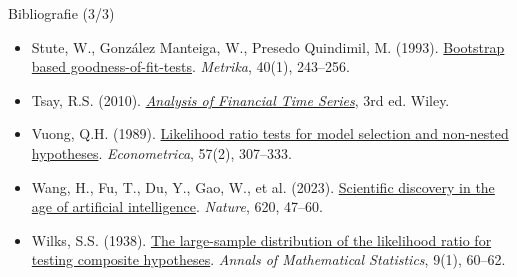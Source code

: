 \begin{frame}{Bibliografie (3/3)}
\begin{itemize}
    \item Stute, W., González Manteiga, W., Presedo Quindimil, M. (1993). \href{https://doi.org/10.1007/BF02613687}{Bootstrap based goodness-of-fit-tests}. \textit{Metrika}, 40(1), 243--256.
    \item Tsay, R.S. (2010). \href{https://doi.org/10.1002/9780470644560}{\textit{Analysis of Financial Time Series}}, 3rd ed. Wiley.
    \item Vuong, Q.H. (1989). \href{https://doi.org/10.2307/1912557}{Likelihood ratio tests for model selection and non-nested hypotheses}. \textit{Econometrica}, 57(2), 307--333.
    \item Wang, H., Fu, T., Du, Y., Gao, W., et al. (2023). \href{https://doi.org/10.1038/s41586-023-06221-2}{Scientific discovery in the age of artificial intelligence}. \textit{Nature}, 620, 47--60.
    \item Wilks, S.S. (1938). \href{https://doi.org/10.1214/aoms/1177732360}{The large-sample distribution of the likelihood ratio for testing composite hypotheses}. \textit{Annals of Mathematical Statistics}, 9(1), 60--62.
\end{itemize}
\end{frame}


